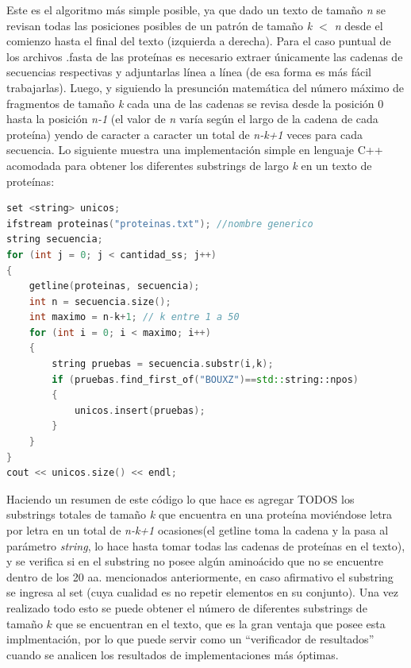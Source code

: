 Este es el algoritmo más simple posible\cite{fuerzabruta}, ya que dado un texto de tamaño \textit{n} se revisan todas las posiciones posibles de un patrón de tamaño \textit{k $<$ n} desde el comienzo hasta el final del texto (izquierda a derecha). Para el caso puntual de los archivos .fasta de las proteínas es necesario extraer únicamente las cadenas de secuencias respectivas y adjuntarlas línea a línea (de esa forma es más fácil trabajarlas). Luego, y siguiendo la presunción matemática del número máximo de fragmentos de tamaño \textit{k} cada una de las cadenas se revisa desde la posición 0 hasta la posición \textit{n-1} (el valor de \textit{n} varía según el largo de la cadena de cada proteína) yendo de caracter a caracter un total de \textit{n-k+1} veces para cada secuencia. Lo siguiente muestra una implementación simple en lenguaje C++ acomodada para obtener los diferentes substrings de largo \textit{k} en un texto de proteínas:
\\
\begin{lstlisting}[language=C++, caption=Búsqueda utilizando fuerza bruta en C++]
set <string> unicos;
ifstream proteinas("proteinas.txt"); //nombre generico
string secuencia;
for (int j = 0; j < cantidad_ss; j++)
{
    getline(proteinas, secuencia);
    int n = secuencia.size();
    int maximo = n-k+1; // k entre 1 a 50
    for (int i = 0; i < maximo; i++)
    {
        string pruebas = secuencia.substr(i,k);
        if (pruebas.find_first_of("BOUXZ")==std::string::npos)
        {
            unicos.insert(pruebas);
        }
    }
}
cout << unicos.size() << endl;
\end{lstlisting}

Haciendo un resumen de este código lo que hace es agregar TODOS los substrings totales de tamaño \textit{k} que encuentra en una proteína moviéndose letra por letra en un total de \textit{n-k+1} ocasiones(el getline toma la cadena y la pasa al parámetro \textit{string}, lo hace hasta tomar todas las cadenas de proteínas en el texto), y se verifica si en el substring no posee algún aminoácido que no se encuentre dentro de los 20 aa. mencionados anteriormente, en caso afirmativo el substring se ingresa al set (cuya cualidad es no repetir elementos en su conjunto). Una vez realizado todo esto se puede obtener el número de diferentes substrings de tamaño $k$ que se encuentran en el texto, que es la gran ventaja que posee esta implmentación, por lo que puede servir como un ``verificador de resultados'' cuando se analicen los resultados de implementaciones más óptimas.

